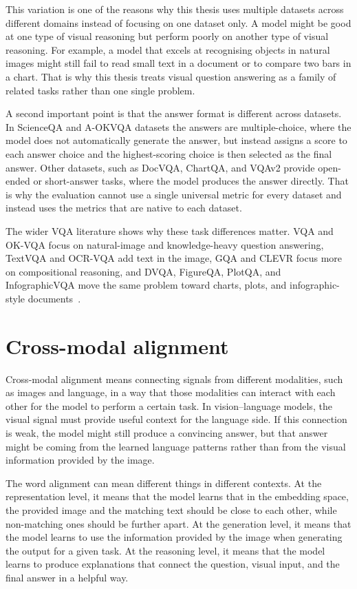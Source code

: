 This variation is one of the reasons why this thesis uses multiple datasets across different domains instead of focusing on one dataset only.
A model might be good at one type of visual reasoning but perform poorly on another type of visual reasoning.
For example, a model that excels at recognising objects in natural images might still fail to read small text in a document or to compare two bars in a chart.
That is why this thesis treats visual question answering as a family of related tasks rather than one single problem.

A second important point is that the answer format is different across datasets.
In ScienceQA and A-OKVQA datasets the answers are multiple-choice, where the model does not automatically generate the answer,
but instead assigns a score to each answer choice and the highest-scoring choice is then selected as the final answer.
Other datasets, such as DocVQA, ChartQA, and VQAv2 provide open-ended or short-answer tasks, where the model produces the answer directly.
That is why the evaluation cannot use a single universal metric for every dataset and instead uses the metrics
that are native to each dataset.

The wider VQA literature shows why these task differences matter.
VQA and OK-VQA focus on natural-image and knowledge-heavy question answering,
TextVQA and OCR-VQA add text in the image,
GQA and CLEVR focus more on compositional reasoning,
and DVQA, FigureQA, PlotQA, and InfographicVQA move the same problem toward charts, plots, and infographic-style documents~\cite{agrawal2017vqa,marino2019okvqa,singh2019textvqa,mishra2019ocrvqa,hudson2019gqa,johnson2017clevr,kafle2018dvqa,kahou2018figureqa,kim2020plotqa,mathew2022infographicvqa}.


\section{Cross-modal alignment}
Cross-modal alignment means connecting signals from different modalities, such as images and language,
in a way that those modalities can interact with each other for the model to perform a certain task.
In vision--language models, the visual signal must provide useful context for the language side.
If this connection is weak, the model might still produce a convincing answer, but that answer might be coming from
the learned language patterns rather than from the visual information provided by the image.

The word alignment can mean different things in different contexts.
At the representation level, it means that the model learns that in the embedding space, the provided image and the matching text should be close to each other, while non-matching ones should be further apart.
At the generation level, it means that the model learns to use the information provided by the image when generating the output for a given task.
At the reasoning level, it means that the model learns to produce explanations that connect the question, visual input, and the final answer in a helpful way.

